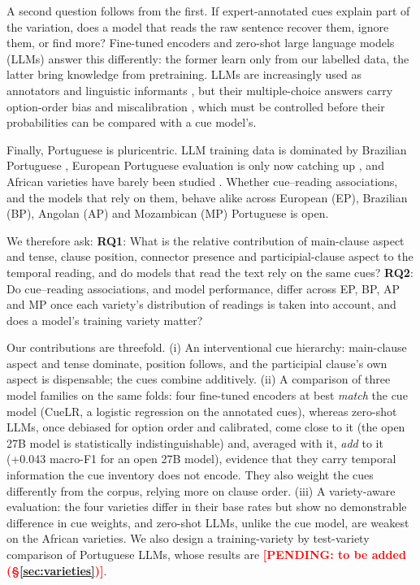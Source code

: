 \documentclass[11pt]{article}
\newcommand{\pending}[1]{\textcolor{red}{\textbf{[PENDING: #1]}}}
\begin{document}
A second question follows from the first. If expert-annotated cues explain part of the variation, does a model that reads the raw sentence recover them, ignore them, or find more? Fine-tuned encoders and zero-shot large language models (LLMs) answer this differently: the former learn only from our labelled data, the latter bring knowledge from pretraining. LLMs are increasingly used as annotators and linguistic informants \citep{gilardi2023chatgpt,begus2025large}, but their multiple-choice answers carry option-order bias and miscalibration \citep{zheng2024selection,guo2017calibration}, which must be controlled before their probabilities can be compared with a cue model's.

Finally, Portuguese is pluricentric. LLM training data is dominated by Brazilian Portuguese \citep{ferreira2026p3b3}, European Portuguese evaluation is only now catching up \citep{vieira2026alba}, and African varieties have barely been studied \citep{alves-etal-2024-african}. Whether cue--reading associations, and the models that rely on them, behave alike across European (EP), Brazilian (BP), Angolan (AP) and Mozambican (MP) Portuguese is open.

We therefore ask:
\textbf{RQ1}: What is the relative contribution of main-clause aspect and tense, clause position, connector presence and participial-clause aspect to the temporal reading, and do models that read the text rely on the same cues?
\textbf{RQ2}: Do cue--reading associations, and model performance, differ across EP, BP, AP and MP once each variety's distribution of readings is taken into account, and does a model's training variety matter?

Our contributions are threefold. (i) An interventional cue hierarchy: main-clause aspect and tense dominate, position follows, and the participial clause's own aspect is dispensable; the cues combine additively. (ii) A comparison of three model families on the same folds: four fine-tuned encoders at best \emph{match} the cue model (CueLR, a logistic regression on the annotated cues), whereas zero-shot LLMs, once debiased for option order and calibrated, come close to it (the open 27B model is statistically indistinguishable) and, averaged with it, \emph{add} to it (+0.043 macro-F1 for an open 27B model), evidence that they carry temporal information the cue inventory does not encode. They also weight the cues differently from the corpus, relying more on clause order. (iii) A variety-aware evaluation: the four varieties differ in their base rates but show no demonstrable difference in cue weights, and zero-shot LLMs, unlike the cue model, are weakest on the African varieties. We also design a training-variety by test-variety comparison of Portuguese LLMs, whose results are \pending{to be added (\S\ref{sec:varieties})}.
\end{document}
